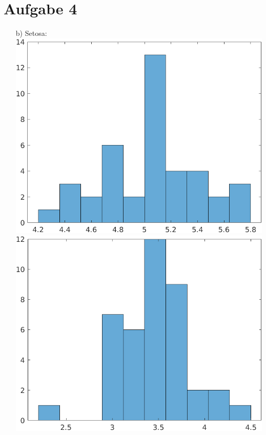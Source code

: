 \documentclass[a4paper]{scrartcl}
\begin{document}
\section*{Aufgabe 4}
\begin{itemize}
	\item[b)] Setosa:\\
		\includegraphics*[scale=0.2]{assignment2_data/plots/setosa_sl.png}
		\includegraphics*[scale=0.2]{assignment2_data/plots/setosa_sb.png}

\end{itemize}
\end{document}
